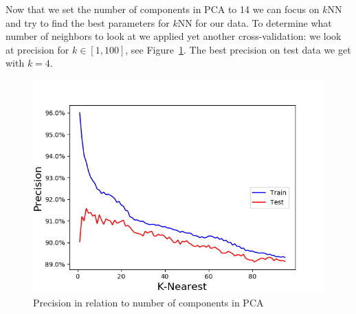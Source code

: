 \documentclass[11pt,a4paper]{article}
\begin{document}
Now that we set the number of components in PCA to 14 we can focus on $k$NN and try to find the best parameters for $k$NN for our data. To determine what number of neighbors to look at we applied yet another cross-validation: we look at precision for $k\in [1,100]$, see Figure~\ref{fig:Hypertune_kNearest}. The best precision on test data we get with $k=4$.
\begin{figure}[ht!]
\begin{center}
\includegraphics[scale=0.60]{Hypertune_kNearest_recall.png}
\caption{Precision in relation to number of components in PCA}
\label{fig:Hypertune_kNearest}
\end{center}
\end{figure}
\end{document}
